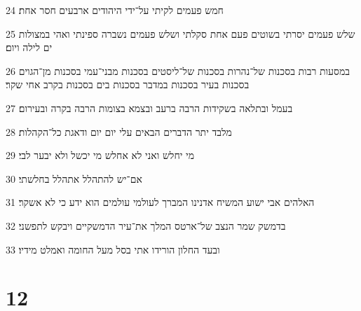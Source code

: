 \par 24 חמש פעמים לקיתי על־ידי היהודים ארבעים חסר אחת׃
\par 25 שלש פעמים יסרתי בשוטים פעם אחת סקלתי ושלש פעמים נשברה ספינתי ואהי במצולות ים לילה ויום׃
\par 26 במסעות רבות בסכנות של־נהרות בסכנות של־ליסטים בסכנות מבני־עמי בסכנות מן־הגוים בסכנות בעיר בסכנות במדבר בסכנות בים בסכנות בקרב אחי שקר׃
\par 27 בעמל ובתלאה בשקידות הרבה ברעב ובצמא בצומות הרבה בקרה ובעירום׃
\par 28 מלבד יתר הדברים הבאים עלי יום יום ודאגת כל־הקהלות׃
\par 29 מי יחלש ואני לא אחלש מי יכשל ולא יבער לבי׃
\par 30 אם־יש להתהלל אתהלל בחלשתי׃
\par 31 האלהים אבי ישוע המשיח אדנינו המברך לעולמי עולמים הוא ידע כי לא אשקר׃
\par 32 בדמשק שמר הנצב של־ארטס המלך את־עיר הדמשקיים ויבקש לתפשני׃
\par 33 ובעד החלון הורידו אתי בסל מעל החומה ואמלט מידיו׃

\chapter{12}

